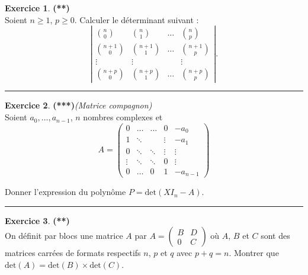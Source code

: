 \documentclass[a4paper,11pt]{article}
\theoremstyle{definition}
\newtheorem{exo}{Exercice} %
\begin{document}
\begin{minipage}{1\linewidth}
\begin{minipage}[t]{0.48\linewidth}
		\begin{exo}\textbf{(**)}\quad\\[0.2cm]
		Soient $n\geq 1$, $p\geq 0$. Calculer le déterminant suivant :
		$$\left|
		\begin{array}{cccc}
		\binom{n}0&\binom n1&\dots&\binom np\\
		\binom{n+1}0&\binom{n+1}1&\dots&\binom{n+1}p\\
		\vdots&\vdots&&\vdots\\
		\binom{n+p}0&\binom{n+p}1&\dots&\binom{n+p}p
		\end{array}
		\right|.
		$$
		
		\centering\rule{1\linewidth}{0.6pt}\end{exo}
		
		
				\begin{exo}\textbf{(***)}\quad \textit{(Matrice compagnon)} \\[0.2cm]
			Soient $a_0, \dots , a_{n-1}$, $n$ nombres complexes et 
			$$A=\left(
			\begin{array}{ccccc}
			0&\ldots&\ldots&0&-a_0\\
			1&\ddots& &\vdots&-a_1\\
			0&\ddots&\ddots&\vdots&\vdots\\
			\vdots&\ddots&\ddots&0&\vdots\\
			0&\ldots&0&1&-a_{n-1}
			\end{array}
			\right)$$
			
			Donner l'expression du polynôme $P =\text{det}(XI_n-A)$.	
			
			\centering\rule{1\linewidth}{0.6pt}\end{exo}
		
\end{minipage}\hfill\vrule\hfill\begin{minipage}[t]{0.48\linewidth}\raggedright

\begin{exo}\textbf{(**)}\quad\\[0.2cm]
On définit par blocs une matrice $A$ par $A=\left(
\begin{array}{cc}
B&D\\
0&C
\end{array}
\right)$ où $A$, $B$ et $C$ sont des matrices carrées de formats respectifs $n$, $p$ et $q$ avec $p+q=n$. Montrer que $\text{det}(A)=\text{det}(B)\times\text{det}(C)$.


\end{exo}
\end{minipage}
\end{minipage}
\end{document}
